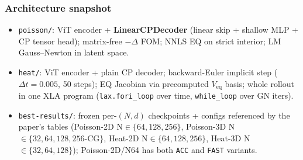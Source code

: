 \subsubsection*{Architecture snapshot}
\begin{itemize}
  \item \texttt{poisson/}: ViT encoder + \textbf{LinearCPDecoder} (linear skip
        + shallow MLP + CP tensor head); matrix-free $-\Delta$ FOM; NNLS EQ on
        strict interior; LM Gauss--Newton in latent space.
  \item \texttt{heat/}: ViT encoder + plain CP decoder; backward-Euler implicit
        step ($\Delta t=0.005$, 50 steps); EQ Jacobian via precomputed
        $V_\text{eq}$ basis; whole rollout in one XLA program
        (\texttt{lax.fori\_loop} over time, \texttt{while\_loop} over GN iters).
  \item \texttt{best-results/}: frozen per-$(N,d)$ checkpoints + configs
        referenced by the paper's tables (Poisson-2D N$\in\{64,128,256\}$,
        Poisson-3D N$\in\{32,64,128,256$-CG$\}$, Heat-2D N$\in\{64,128,256\}$,
        Heat-3D N$\in\{32,64,128\}$); Poisson-2D/N64 has both \texttt{ACC} and
        \texttt{FAST} variants.
\end{itemize}

